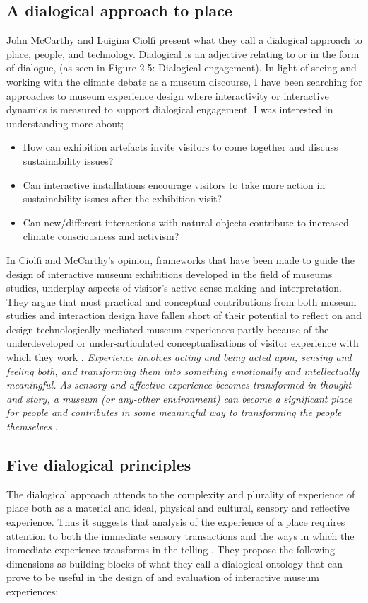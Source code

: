\subsection{A dialogical approach to place}
John McCarthy and Luigina Ciolfi present what they call a dialogical approach to place, people, and technology. Dialogical is an adjective relating to or in the form of dialogue, (as seen in Figure 2.5: Dialogical engagement). In light of seeing and working with the climate debate as a museum discourse, I have been searching for approaches to museum experience design where interactivity or interactive dynamics is measured to support dialogical engagement. I was interested in understanding more about;
\begin{itemize}
    \item How can exhibition artefacts invite visitors to come together and discuss sustainability issues?
    \item Can interactive installations encourage visitors to take more action in sustainability issues after the exhibition visit?
    \item Can new/different interactions with natural objects contribute to increased climate consciousness and activism?
\end{itemize}



In Ciolfi and McCarthy’s opinion, frameworks that have been made to guide the design of interactive museum exhibitions developed in the field of museums studies, underplay aspects of visitor’s active sense making and interpretation. They argue that most practical and conceptual contributions from both museum studies and interaction design have fallen short of their potential to reflect on and design technologically mediated museum experiences partly because of the underdeveloped or under-articulated conceptualisations of visitor experience with which they work \autocite[p. 248]{mccarthy_place}. \emph{Experience involves acting and being acted upon, sensing and feeling both, and transforming them into something emotionally and intellectually meaningful. As sensory and affective experience becomes transformed in thought and story, a museum (or any-other environment) can become a significant place for people and contributes in some meaningful way to transforming the people themselves} \autocite[p. 250]{mccarthy_place}.


\subsection{Five dialogical principles}
The dialogical approach attends to the complexity and plurality of experience of place both as a material and ideal, physical and cultural, sensory and reflective experience. Thus it suggests that analysis of the experience of a place requires attention to both the immediate sensory transactions and the ways in which the immediate experience transforms in the telling \autocite[p. 251]{mccarthy_place}. They propose the following dimensions as building blocks of what they call a dialogical ontology that can prove to be useful in the design of and evaluation of interactive museum experiences:

